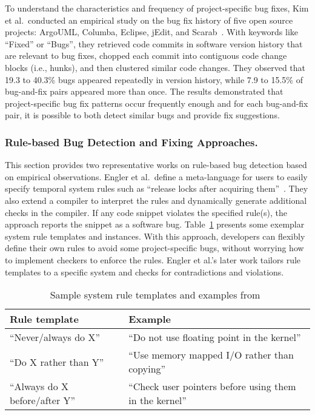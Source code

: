 To understand the characteristics and frequency of project-specific bug fixes, Kim et al.~conducted an empirical study on the bug fix history of five open source projects: ArgoUML, Columba, Eclipse, jEdit, and Scarab~\cite{Kim2006:MBF}. With keywords like ``Fixed'' or ``Bugs'', they retrieved code commits in software version history that are relevant to bug fixes, chopped each commit into contiguous code change blocks (i.e., hunks), and then clustered similar code changes. They observed that 19.3 to 40.3\% bugs appeared repeatedly in version history, while 7.9 to 15.5\% of bug-and-fix pairs appeared more than once. The results demonstrated that project-specific bug fix patterns occur frequently enough and for each bug-and-fix pair, it is possible to both detect similar bugs and provide fix suggestions. 

\subsubsection{Rule-based Bug Detection and Fixing Approaches.}
This section provides two representative works on rule-based bug detection based on empirical observations.
Engler et al.~define a meta-language for users to easily specify temporal system rules such as ``release locks after acquiring them''~\cite{Engler2000:CSR}. They also extend a compiler to interpret the rules and dynamically generate additional checks in the compiler. If any code snippet violates the specified rule(s), the approach reports the snippet as a software bug. Table~\ref{tab:rule} presents some exemplar system rule templates and instances. With this approach, developers can flexibly define their own rules to avoid some project-specific bugs, without worrying how to implement checkers to enforce the rules. Engler et al.'s later work tailors rule templates to a specific system and checks for contradictions and violations\cite{engler01bugs}.  

\begin{table}[]
\centering
\caption{Sample system rule templates and examples from~\cite{Engler2000:CSR}}
\label{tab:rule}
\begin{tabular}{l|l}
\toprule
Rule template                  & Example                                                 \\ \hline
``Never/always do X''          & ``Do not use floating point in the kernel''             \\\hline
``Do X rather than Y''         & ``Use memory mapped I/O rather than copying''           \\ \hline
``Always do X before/after Y'' & ``Check user pointers before using them in the kernel''\\
\bottomrule
\end{tabular}
\end{table} 


